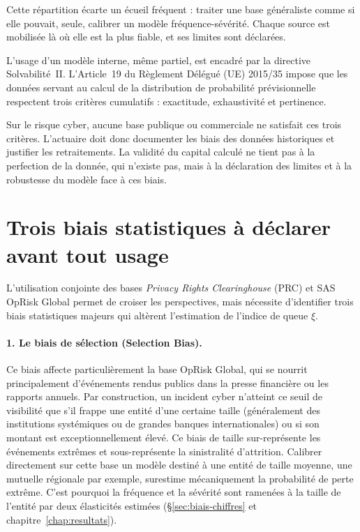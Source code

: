 Cette répartition écarte un écueil fréquent : traiter une base généraliste comme si elle
pouvait, seule, calibrer un modèle fréquence-sévérité. Chaque source est mobilisée là où elle
est la plus fiable, et ses limites sont déclarées.



L'usage d'un modèle interne, même partiel, est encadré par la directive Solvabilité~II.
L'Article~19 du Règlement Délégué (UE) 2015/35 impose que les données servant au calcul de la
distribution de probabilité prévisionnelle respectent trois critères cumulatifs : exactitude,
exhaustivité et pertinence.

Sur le risque cyber, aucune base publique ou commerciale ne satisfait ces trois critères.
L'actuaire doit donc documenter les biais des données historiques et justifier les
retraitements. La validité du capital calculé ne tient pas à la perfection de la donnée, qui
n'existe pas, mais à la déclaration des limites et à la robustesse du modèle face à ces
biais.




\section{Trois biais statistiques à déclarer avant tout usage}

L'utilisation conjointe des bases \emph{Privacy Rights Clearinghouse} (PRC) et SAS OpRisk Global permet de croiser les perspectives, mais nécessite d'identifier trois biais statistiques majeurs qui altèrent l'estimation de l'indice de queue $\xi$.

\paragraph{1. Le biais de sélection (Selection Bias).}
Ce biais affecte particulièrement la base OpRisk Global, qui se nourrit principalement d'événements rendus publics dans la presse financière ou les rapports annuels. Par construction, un incident cyber n'atteint ce seuil de visibilité que s'il frappe une entité d'une certaine taille (généralement des institutions systémiques ou de grandes banques internationales) ou si son montant est exceptionnellement élevé.
Ce biais de taille sur-représente les événements extrêmes et sous-représente la sinistralité
d'attrition. Calibrer directement sur cette base un modèle destiné à une entité de taille
moyenne, une mutuelle régionale par exemple, surestime mécaniquement la probabilité de perte
extrême. C'est pourquoi la fréquence et la sévérité sont ramenées à la taille de l'entité par
deux élasticités estimées (\S\ref{sec:biais-chiffres} et chapitre~\ref{chap:resultats}).


